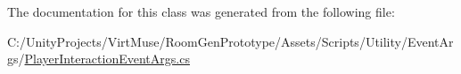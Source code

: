 The documentation for this class was generated from the following file\+:\begin{DoxyCompactItemize}
\item 
C\+:/\+Unity\+Projects/\+Virt\+Muse/\+Room\+Gen\+Prototype/\+Assets/\+Scripts/\+Utility/\+Event\+Args/\mbox{\hyperlink{_player_interaction_event_args_8cs}{Player\+Interaction\+Event\+Args.\+cs}}\end{DoxyCompactItemize}
